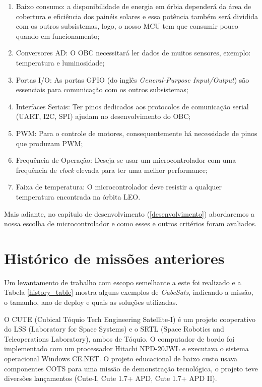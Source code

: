 \begin{enumerate}
    \item Baixo consumo: a disponibilidade de energia em órbia dependerá da área de cobertura e eficiência dos painéis solares e essa potência também será dividida com os outros subsistemas, logo, o nosso MCU tem que consumir pouco quando em funcionamento;
    \item Conversores AD: O OBC necessitará ler dados de muitos sensores, exemplo: temperatura e luminosidade;
    \item Portas I/O: As portas GPIO (do inglês \textit{General-Purpose Input/Output}) são essenciais para comunicação com os outros subsistemas;
    \item Interfaces Seriais: Ter pinos dedicados aos protocolos de comunicação serial (UART, I2C, SPI) ajudam no desenvolvimento do OBC;
    \item PWM: Para o controle de motores, consequentemente há necessidade de pinos que produzam PWM;
    \item Frequência de Operação: Deseja-se usar um microcontrolador com uma frequência de \textit{clock} elevada para ter uma melhor performance;
    \item Faixa de temperatura: O microcontrolador deve resistir a qualquer temperatura encontrada na órbita LEO.
\end{enumerate}

Mais adiante, no capítulo de desenvolvimento (\ref{desenvolvimento}) abordaremos a nossa escolha de microcontrolador e como esses e outros critérios foram avaliados.


\section{Histórico de missões anteriores}\label{missions_history}

Um levantamento de trabalho com escopo semelhante a este foi realizado e a Tabela \ref{history_table} mostra alguns exemplos de \textit{CubeSats}, indicando a missão, o tamanho, ano de deploy e quais as soluções utilizadas.



O CUTE \cite{cute1_ref} (Cubical  Tóquio  Tech  Engineering  Satellite-I) é um projeto cooperativo do LSS (Laboratory for Space Systems) e o SRTL (Space Robotics and Teleoperations Laboratory), ambos de Tóquio. O computador de bordo foi implementado com um processador Hitachi NPD-20JWL e executava o sistema operacional Windows CE.NET. O  projeto  educacional  de  baixo  custo  usava componentes COTS para uma missão de demonstração tecnológica, o projeto teve diversões lançamentos (Cute-I, Cute 1.7+ APD, Cute 1.7+ APD II). 

